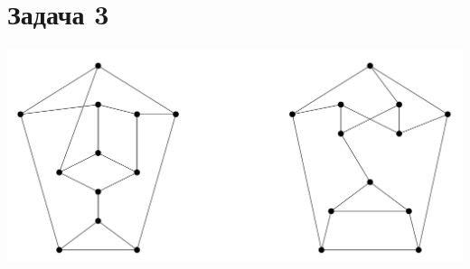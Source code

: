 \documentclass{article}
\begin{document}
\section*{Задача 3}
\begin{center}
    \includegraphics*[scale=0.2]{img1}
\end{center}
\end{document}
